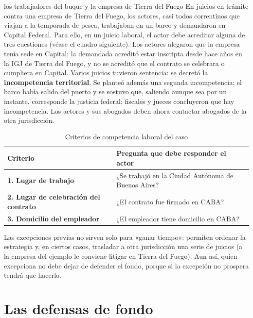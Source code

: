 \documentclass[12pt,oneside]{book}
\begin{document}
\begin{ejemplo}{los trabajadores del buque y la empresa de Tierra del Fuego}
En juicios en trámite contra una empresa de Tierra del Fuego, los actores, casi todos correntinos que viajan a la temporada de pesca, trabajaban en un barco y demandaron en Capital Federal. Para ello, en un juicio laboral, el actor debe acreditar alguna de tres cuestiones (véase el cuadro siguiente). Los actores alegaron que la empresa tenía sede en Capital; la demandada acreditó estar inscripta desde hace años en la IGJ de Tierra del Fuego, y no se acreditó que el contrato se celebrara o cumpliera en Capital. Varios juicios tuvieron sentencia: se decretó la \textbf{incompetencia territorial}. Se planteó además una segunda incompetencia: el barco había salido del puerto y se sostuvo que, saliendo aunque sea por un instante, corresponde la justicia federal; fiscales y jueces concluyeron que hay incompetencia. Los actores y sus abogados deben ahora contactar abogados de la otra jurisdicción.
\end{ejemplo}

\begin{table}[H]
\centering
\caption{Criterios de competencia laboral del caso}
\begin{tabularx}{\textwidth}{>{\raggedright\arraybackslash\bfseries}p{} X}
\toprule
Criterio & Pregunta que debe responder el actor \\
\midrule
1. Lugar de trabajo & ¿Se trabajó en la Ciudad Autónoma de Buenos Aires? \\
2. Lugar de celebración del contrato & ¿El contrato fue firmado en CABA? \\
3. Domicilio del empleador & ¿El empleador tiene domicilio en CABA? \\
\bottomrule
\end{tabularx}
\end{table}

\begin{importante}
Las excepciones previas no sirven solo para «ganar tiempo»: permiten ordenar la estrategia y, en ciertos casos, trasladar a otra jurisdicción una serie de juicios (a la empresa del ejemplo le conviene litigar en Tierra del Fuego). Aun así, quien excepciona no debe dejar de defender el fondo, porque si la excepción no prospera tendrá que hacerlo.
\end{importante}

\section{Las defensas de fondo}
\end{document}
